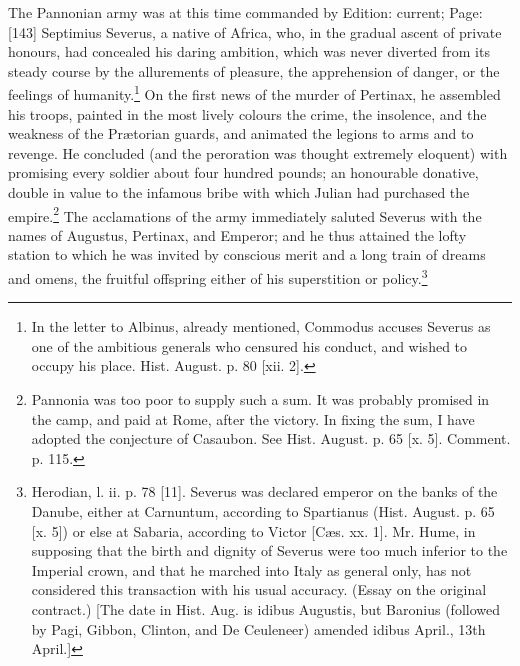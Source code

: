 The Pannonian army was at this time commanded by Edition: current; Page: [143] Septimius Severus, a native of Africa, who, in the gradual ascent of private honours, had concealed his daring ambition, which was never diverted from its steady course by the allurements of pleasure, the apprehension of danger, or the feelings of humanity.\footnote{In the letter to Albinus, already mentioned, Commodus accuses Severus as one of the ambitious generals who censured his conduct, and wished to occupy his place. Hist. August. p. 80 [xii. 2].} On the first news of the murder of Pertinax, he assembled his troops, painted in the most lively colours the crime, the insolence, and the weakness of the Prætorian guards, and animated the legions to arms and to revenge. He concluded (and the peroration was thought extremely eloquent) with promising every soldier about four hundred pounds; an honourable donative, double in value to the infamous bribe with which Julian had purchased the empire.\footnote{Pannonia was too poor to supply such a sum. It was probably promised in the camp, and paid at Rome, after the victory. In fixing the sum, I have adopted the conjecture of Casaubon. See Hist. August. p. 65 [x. 5]. Comment. p. 115.} The acclamations of the army immediately saluted Severus with the names of Augustus, Pertinax, and Emperor; and he thus attained the lofty station to which he was invited by conscious merit and a long train of dreams and omens, the fruitful offspring either of his superstition or policy.\footnote{Herodian, l. ii. p. 78 [11]. Severus was declared emperor on the banks of the Danube, either at Carnuntum, according to Spartianus (Hist. August. p. 65 [x. 5]) or else at Sabaria, according to Victor [Cæs. xx. 1]. Mr. Hume, in supposing that the birth and dignity of Severus were too much inferior to the Imperial crown, and that he marched into Italy as general only, has not considered this transaction with his usual accuracy. (Essay on the original contract.) [The date in Hist. Aug. is idibus Augustis, but Baronius (followed by Pagi, Gibbon, Clinton, and De Ceuleneer) amended idibus April., 13th April.]}

